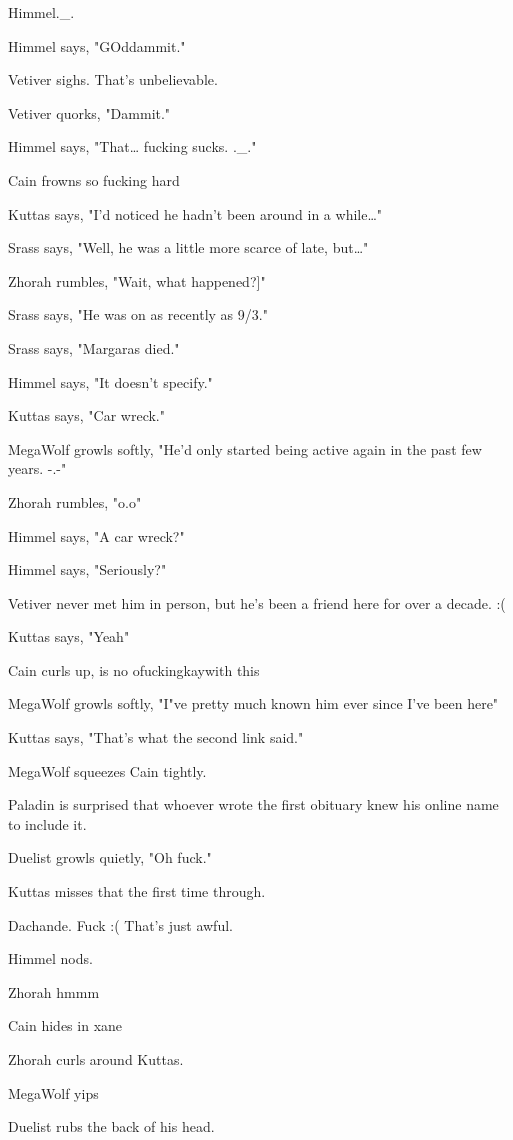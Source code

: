 Himmel.\_.

Himmel says, "GOddammit."

Vetiver sighs. That's unbelievable.

Vetiver quorks, "Dammit."

Himmel says, "That\ldots{} fucking sucks. .\_."

Cain frowns so fucking hard

Kuttas says, "I'd noticed he hadn't been around in a while\ldots{}"

Srass says, "Well, he was a little more scarce of late, but\ldots{}"

Zhorah rumbles, "Wait, what happened?]"

Srass says, "He was on as recently as 9/3."

Srass says, "Margaras died."

Himmel says, "It doesn't specify."

Kuttas says, "Car wreck."

MegaWolf growls softly, "He'd only started being active again in the past few years. -.-"

Zhorah rumbles, "o.o"

Himmel says, "A car wreck?"

Himmel says, "Seriously?"

Vetiver never met him in person, but he's been a friend here for over a decade. :(

Kuttas says, "Yeah"

Cain curls up, is no ofuckingkaywith this

MegaWolf growls softly, "I"ve pretty much known him ever since I've been here"

Kuttas says, "That's what the second link said."

MegaWolf squeezes Cain tightly.

Paladin is surprised that whoever wrote the first obituary knew his online name to include it.

Duelist growls quietly, "Oh fuck."

Kuttas misses that the first time through.

Dachande. Fuck :( That's just awful.

Himmel nods.

Zhorah hmmm

Cain hides in xane

Zhorah curls around Kuttas.

MegaWolf yips

Duelist rubs the back of his head.

